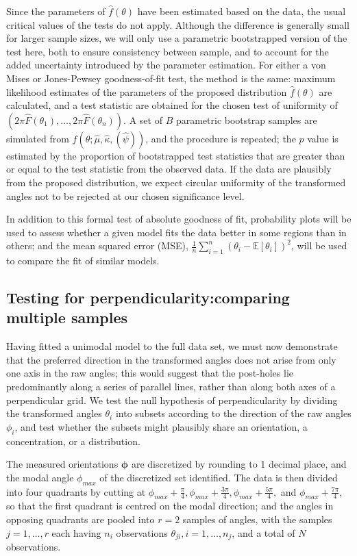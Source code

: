 \documentclass[../../ArchStats.tex]{subfiles}
\begin{document}
Since the parameters of $\hat{f}(\theta)$ have been estimated based on the data, the usual critical values of the tests do not apply. Although the difference is generally small for larger sample sizes, we will only use a parametric bootstrapped version of the test here,  both to ensure consistency between sample, and to account for the added uncertainty introduced by the parameter estimation. For either a von Mises or Jones-Pewsey goodness-of-fit test, the method is the same: maximum likelihood estimates of the parameters of the proposed distribution $\hat{f}(\theta)$ are calculated, and a test statistic are obtained for the chosen test of uniformity of $( 2\pi \hat{F}(\theta_1), \dots, 2\pi \hat{F}(\theta_n) )$. A set of $B$ parametric bootstrap samples are simulated from $\hat{f}(\theta; \hat{\mu}, \hat{\kappa}, (\hat{\psi}))$, and the procedure is repeated; the $p$ value is estimated by the proportion of bootstrapped test statistics that are greater than or equal to the test statistic from the observed data. If the data are plausibly from the proposed distribution, we expect circular uniformity of the transformed angles not to be rejected at our chosen significance level.

In addition to this formal test of absolute goodness of fit, probability plots will be used to assess whether a given model fits the data better in some regions than in others; and the mean squared error (MSE), $\frac{1}{n} \sum_{i=1}^n (\theta_i - \mathbb{E}\left[\theta_i\right])^2$, will be used to compare the fit of similar models.



\subsection{Testing for perpendicularity:comparing multiple samples}
\label{sec:similarity-tests}

Having fitted a unimodal model to the full data set, we must now demonstrate that the preferred direction in the transformed angles does not arise from only one axis in the raw angles; this would suggest that the post-holes lie predominantly along a series of parallel lines, rather than along both axes of a perpendicular grid. We test the null hypothesis of perpendicularity by dividing the transformed angles $\theta_i$ into subsets according to the direction of the raw angles $\phi_i$, and test whether the subsets might plausibly share an orientation, a concentration, or a distribution.

The measured orientations  $\boldsymbol{\phi}$ are discretized by rounding to 1 decimal place, and the modal angle $\phi_{max}$ of the discretized set identified. The data is then divided into four quadrants by cutting at $\phi_{max} + \frac{\pi}{4}, \phi_{max} + \frac{3\pi}{4}, \phi_{max} + \frac{5\pi}{4},$ and $\phi_{max} + \frac{7\pi}{4}$, so that the first quadrant is centred on the modal direction; and the angles in opposing quadrants are pooled into $r = 2$ samples of angles, with the samples $j = 1, \dots, r$ each having $n_i$ observations $\theta_{ji}, i = 1, \dots, n_j$, and a total of $N$ observations.
\end{document}
